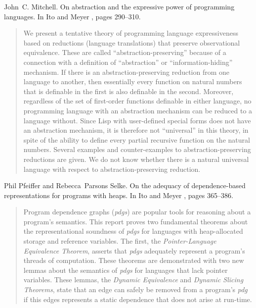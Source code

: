 \begin{thebibliography}{10}
John~C. Mitchell.
\newblock On abstraction and the expressive power of programming languages.
\newblock In Ito and Meyer \cite{TACS91}, pages 290--310.
\begin{quotation}
We present a tentative theory of programming language expressiveness based on
  reductions (language translations) that preserve observational equivalence.
  These are called ``abstraction-preserving'' because of a connection with a
  definition of ``abstraction'' or ``information-hiding'' mechanism. If there
  is an abstraction-preserving reduction from one language to another, then
  essentially every function on natural numbers that is definable in the first
  is also definable in the second. Moreover, regardless of the set of
  first-order functions definable in either language, no programming language
  with an abstraction mechanism can be reduced to a language without. Since
  Lisp with user-defined special forms does not have an abstraction mechanism,
  it is therefore not ``universal'' in this theory, in spite of the ability to
  define every partial recursive function on the natural numbers. Several
  examples and counter-examples to abstraction-preserving reductions are given.
  We do not know whether there is a natural universal language with respect to
  abstraction-preserving reduction.
\end{quotation}

Phil Pfeiffer and Rebecca~Parsons Selke.
\newblock On the adequacy of dependence-based representations for programs with
  heaps.
\newblock In Ito and Meyer \cite{TACS91}, pages 365--386.
\begin{quotation}
Program dependence graphs ({\em pdgs\/}) are popular tools for reasoning about
  a program's semantics. This report proves two fundamental theorems about the
  representational soundness of {\em pdgs\/} for languages with heap-allocated
  storage and reference variables. The first, the {\em Pointer-Language
  Equivalence Theorem}, asserts that {\em pdgs\/} adequately represent a
  program's threads of computation. These theorems are demonstrated with two
  new lemmas about the semantics of {\em pdgs\/} for languages that lack
  pointer variables. These lemmas, the {\em Dynamic Equivalence\/} and {\em
  Dynamic Slicing Theorems}, state that an edge can safely be removed from a
  program's {\em pdg\/} if this edges represents a static dependence that does
  not arise at run-time.
\end{quotation}


\end{thebibliography}
